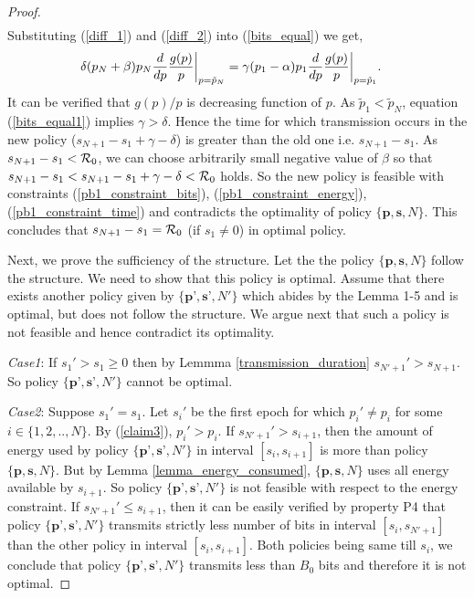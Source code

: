 \begin{proof}
\begin{align}
\end{align}
Substituting (\ref{diff_1}) and (\ref{diff_2}) into (\ref{bits_equal}) we get,
\begin{align}
&\delta(p_N+\beta)p_N\frac{d}{dp} \frac{g(p)}{p}  \bigg{\vert}_{p=\tilde{p}_N}
=\gamma(p_1-\alpha)p_1\frac{d}{dp} \frac{g(p)}{p} \bigg{\vert}_{p=\tilde{p}_1}.\label{bits_equal1}
\end{align}
It can be verified that $g(p)/p$ is decreasing function of $p$. As $\tilde{p}_1<\tilde{p}_N$, equation (\ref{bits_equal1}) implies $\gamma >\delta$. Hence the time for which transmission occurs in the new policy ($s_{N+1}-s_1+\gamma-\delta$) is greater than the old one i.e. $s_{N+1}-s_1$. As $s_{N+1}-s_1<\mathcal{R}_0$, we can choose arbitrarily small negative value of $\beta$ so that $s_{N+1}-s_1<s_{N+1}-s_1+\gamma -\delta<\mathcal{R}_0$ holds. So the new policy is feasible with constraints  (\ref{pb1_constraint_bits}), (\ref{pb1_constraint_energy}), (\ref{pb1_constraint_time}) and contradicts the optimality of policy $\{\textbf{p},\textbf{s},N\}$. This concludes that $s_{N+1}-s_1=\mathcal{R}_0$ (if $s_1\neq 0$) in optimal policy.

Next, we prove the sufficiency of the structure. Let the the policy $\{\textbf{p},\textbf{s},N\}$ follow the structure. We need to show that this policy is optimal. Assume that there exists another policy given by $\{\textbf{p'},\textbf{s'},N'\}$ which abides by the Lemma 1-5 and is optimal, but does not follow the structure. We argue next that such a policy is not feasible and hence contradict its optimality. 

\textit{Case1}: If $s_1'>s_1\ge 0$ then by Lemmma \ref{transmission_duration} $s_{N'+1}'>s_{N+1}$. So policy $\{\textbf{p'},\textbf{s'},N'\}$ cannot be optimal. 

\textit{Case2}: Suppose $s_1'=s_1$. Let $s_i'$ be the first epoch for which $p_i'\ne p_i$ for some $i \in \{1,2,..,N\}$. By (\ref{claim3}), $p_i'>p_i$. If $s_{N'+1}'>s_{i+1}$, then the amount of energy used by policy $\{ \textbf{p'},\textbf{s'},N'\}$ in interval $[s_{i},s_{i+1}]$ is more than policy $\{\textbf{p},\textbf{s},N\}$. But by Lemma \ref{lemma_energy_consumed}, $\{\textbf{p},\textbf{s},N\}$ uses all energy available by $s_{i+1}$. So policy $\{\textbf{p'},\textbf{s'},N'\}$ is not feasible with respect to the energy constraint. If $s_{N'+1}'\le s_{i+1}$, then it can be easily verified by property P4 that policy $\{\textbf{p'},\textbf{s'},N'\}$ transmits strictly less number of bits in interval $[s_i,s_{N'+1}]$ than the other policy in interval $[s_{i},s_{i+1}]$. Both policies being same till $s_i$, we conclude that policy $\{\textbf{p'},\textbf{s'},N'\}$ transmits less than $B_0$  bits and therefore it is not optimal.


\end{proof}
